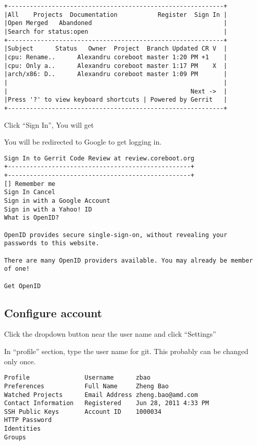\documentclass[titlepage,12pt]{article}
\begin{document}
{%
{ \small
\begin{verbatim}
+-----------------------------------------------------------+
|All    Projects  Documentation           Register  Sign In |
|Open Merged   Abandoned                                    |
|Search for status:open                                     |
+-----------------------------------------------------------+
|Subject      Status   Owner  Project  Branch Updated CR V  |
|cpu: Rename..      Alexandru coreboot master 1:20 PM +1    |
|cpu: Only a..      Alexandru coreboot master 1:17 PM    X  |
|arch/x86: D..      Alexandru coreboot master 1:09 PM       |
|                                                           |
|                                                  Next ->  |
|Press '?' to view keyboard shortcuts | Powered by Gerrit   |
+-----------------------------------------------------------+
\end{verbatim}
}
Click ``Sign In'', You will get


You will be redirected to Google to get logging in.

{ \small
\begin{verbatim}
Sign In to Gerrit Code Review at review.coreboot.org
+--------------------------------------------------+
+--------------------------------------------------+
[] Remember me
Sign In Cancel
Sign in with a Google Account
Sign in with a Yahoo! ID
What is OpenID?

OpenID provides secure single-sign-on, without revealing your passwords to this website.

There are many OpenID providers available. You may already be member of one!

Get OpenID
\end{verbatim}
}

\subsection{Configure account}
Click the dropdown button near the user name and click ``Settings''


\label{user name} In ``profile'' section, type the user name for git. This probably can be changed only once.
{ \small
\begin{verbatim}
Profile               Username      zbao
Preferences           Full Name     Zheng Bao
Watched Projects      Email Address zheng.bao@amd.com
Contact Information   Registered    Jun 28, 2011 4:33 PM
SSH Public Keys       Account ID    1000034
HTTP Password
Identities
Groups
\end{verbatim}
}

}
\end{document}
